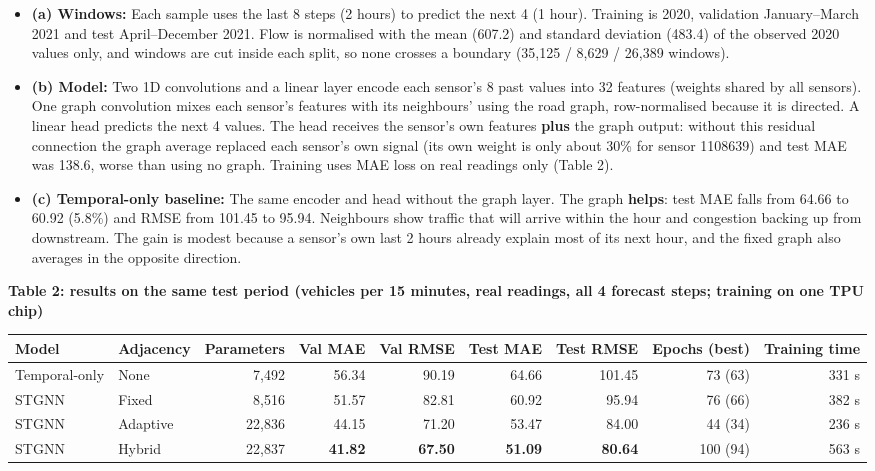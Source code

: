 
\begin{itemize}
    \item \textbf{(a) Windows:} Each sample uses the last 8 steps (2 hours) to predict the next 4 (1 hour). Training is 2020, validation January--March 2021 and test April--December 2021. Flow is normalised with the mean (607.2) and standard deviation (483.4) of the observed 2020 values only, and windows are cut inside each split, so none crosses a boundary (35,125 / 8,629 / 26,389 windows).
    \item \textbf{(b) Model:} Two 1D convolutions and a linear layer encode each sensor's 8 past values into 32 features (weights shared by all sensors). One graph convolution mixes each sensor's features with its neighbours' using the road graph, row-normalised because it is directed. A linear head predicts the next 4 values. The head receives the sensor's own features \textbf{plus} the graph output: without this residual connection the graph average replaced each sensor's own signal (its own weight is only about 30\% for sensor 1108639) and test MAE was 138.6, worse than using no graph. Training uses MAE loss on real readings only (Table 2).
    \item \textbf{(c) Temporal-only baseline:} The same encoder and head without the graph layer. The graph \textbf{helps}: test MAE falls from 64.66 to 60.92 (5.8\%) and RMSE from 101.45 to 95.94. Neighbours show traffic that will arrive within the hour and congestion backing up from downstream. The gain is modest because a sensor's own last 2 hours already explain most of its next hour, and the fixed graph also averages in the opposite direction.
\end{itemize}

\vspace{4pt}\noindent\begin{minipage}{\textwidth}
\centering\footnotesize
\textbf{Table 2: results on the same test period (vehicles per 15 minutes, real readings, all 4 forecast steps; training on one TPU chip)}\\[2pt]
\begin{tabular}{@{}llrrrrrrr@{}}
\toprule
Model & Adjacency & Parameters & Val MAE & Val RMSE & Test MAE & Test RMSE & Epochs (best) & Training time \\
\midrule
Temporal-only & None & 7,492 & 56.34 & 90.19 & 64.66 & 101.45 & 73 (63) & 331 s \\
STGNN & Fixed & 8,516 & 51.57 & 82.81 & 60.92 & 95.94 & 76 (66) & 382 s \\
STGNN & Adaptive & 22,836 & 44.15 & 71.20 & 53.47 & 84.00 & 44 (34) & 236 s \\
STGNN & Hybrid & 22,837 & \textbf{41.82} & \textbf{67.50} & \textbf{51.09} & \textbf{80.64} & 100 (94) & 563 s \\
\bottomrule
\end{tabular}
\end{minipage}
\vspace{4pt}
